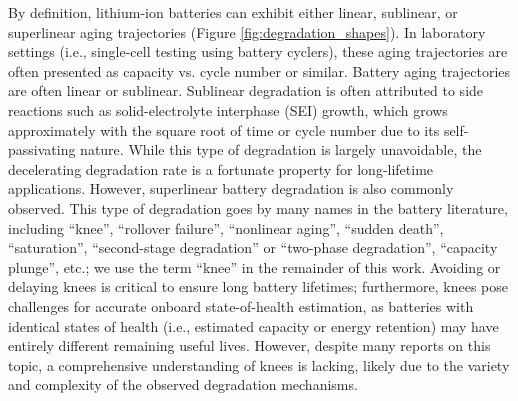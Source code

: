 \documentclass[journal=jpclcd,manuscript=article]{achemso}
\begin{document}
By definition, lithium-ion batteries can exhibit either linear, sublinear, or superlinear aging trajectories (Figure \ref{fig:degradation_shapes}). In laboratory settings (i.e., single-cell testing using battery cyclers), these aging trajectories are often presented as capacity vs. cycle number or similar. Battery aging trajectories are often linear\cite{ma_editors_2019, keil_electrochemical_2020,  preger_degradation_2020} or sublinear\cite{bloom_accelerated_2001, broussely_aging_2001, wright_calendar-_2002, smith_high_2011, attia_revisiting_2020}{}. Sublinear degradation is often attributed to side reactions such as solid-electrolyte interphase (SEI) growth, which grows approximately with the square root of time or cycle number due to its self-passivating nature.\cite{bloom_accelerated_2001, broussely_aging_2001, broussely_main_2005, wright_calendar-_2002, smith_high_2011, attia_revisiting_2020} While this type of degradation is largely unavoidable, the decelerating degradation rate is a fortunate property for long-lifetime applications. However, superlinear battery degradation is also commonly observed. This type of degradation goes by many names in the battery literature, including ``knee''\cite{diao_algorithm_2019, fermin-cueto_identification_2020}{}, ``rollover failure''\cite{ma_editors_2019}{}, ``nonlinear aging''\cite{schuster_nonlinear_2015, bach_nonlinear_2016, yang_modeling_2017, mandli_analysis_2019, keil_linear_2019, keil_electrochemical_2020, atalay_theory_2020}{}, ``sudden death''\cite{muller_model-based_2019, willenberg_development_2020, kupper_end--life_2018}{}, ``saturation''\cite{lin_comprehensive_2013}{}, ``second-stage degradation''\cite{dubarry_perspective_2020} or ``two-phase degradation''\cite{pugalenthi_piecewise_2020}{}, ``capacity plunge''\cite{fang_capacity_2021}{}, etc.; we use the term ``knee'' in the remainder of this work.
Avoiding or delaying knees is critical to ensure long battery lifetimes; furthermore, knees pose challenges for accurate onboard state-of-health estimation, as batteries with identical states of health (i.e., estimated capacity or energy retention) may have entirely different remaining useful lives\cite{dubarry_perspective_2020, braco_experimental_2020}. However, despite many reports on this topic, a comprehensive understanding of knees is lacking, likely due to the variety and complexity of the observed degradation mechanisms.
\end{document}
